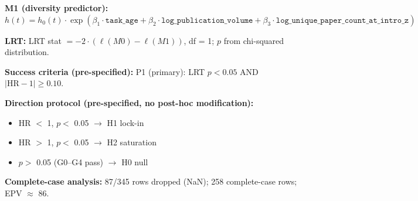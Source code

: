 \textbf{M1 (diversity predictor):} $h(t) = h_{0}(t) \cdot \exp(\beta_{1}\cdot\texttt{task\_age} + \beta_{2}\cdot\texttt{log\_publication\_volume} + \beta_{3}\cdot\texttt{log\_unique\_paper\_count\_at\_intro\_z})$

\textbf{LRT:} LRT stat $= -2\cdot(\ell(M0) - \ell(M1))$, df = 1; $p$ from chi-squared distribution.

\textbf{Success criteria (pre-specified):} P1 (primary): LRT $p < 0.05$ AND $|\text{HR}-1| \geq 0.10$.

\textbf{Direction protocol (pre-specified, no post-hoc modification):}
\begin{itemize}
  \item HR $<$ 1, $p <$ 0.05 $\to$ H1 lock-in
  \item HR $>$ 1, $p <$ 0.05 $\to$ H2 saturation
  \item $p >$ 0.05 (G0--G4 pass) $\to$ H0 null
\end{itemize}

\textbf{Complete-case analysis:} 87/345 rows dropped (NaN); 258 complete-case rows; EPV $\approx$ 86.
